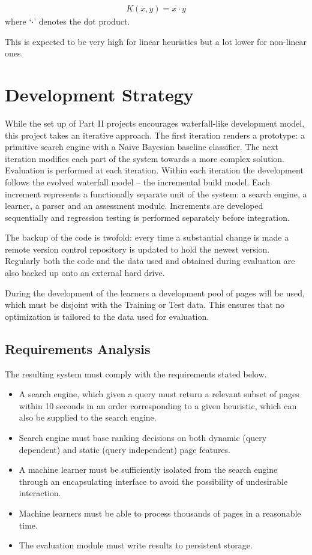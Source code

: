 \documentclass[12pt,twoside,notitlepage]{report}
\begin{document}
\begin{gather*}
K(x,y) = x \cdot y
\end{gather*}
where `\(\cdot\)' denotes the dot product.

This is expected to be very high for linear heuristics but a lot lower for
non-linear ones.

\section{Development Strategy}
While the set up of Part II projects encourages waterfall-like development
model, this project takes an iterative approach. The first iteration renders a
prototype: a primitive search engine with a Naive Bayesian baseline classifier.
The next iteration modifies each part of the system towards a more complex
solution. Evaluation is performed at each iteration. Within each  iteration the
development follows the evolved waterfall model -- the incremental build model.
Each increment represents a functionally separate unit of the system: a search
engine, a learner, a parser and an assessment module. Increments are developed
sequentially and regression testing is performed separately before integration.

The backup of the code is twofold: every time a substantial change is made a remote
version control repository is updated to hold the newest version. Regularly both the code and
the data used and obtained during evaluation are also backed up onto an
external hard drive. 

During the development of the learners a development pool of pages will
be used, which must be disjoint with the Training or Test data. This ensures
that no optimization is tailored to the data used for evaluation. 

\subsection*{Requirements Analysis}
The resulting system must comply with the requirements stated below. 
\begin{itemize}
  \item{A search engine, which given a query must return a relevant subset of
      pages within 10 seconds in an order corresponding to a given heuristic, which can also be
  supplied to the search engine.}
  \item{Search engine must base ranking decisions on both dynamic
      (query dependent) and static (query independent)
    page features.}
  \item{A machine learner must be sufficiently isolated from the search engine
    through an encapsulating interface to avoid the possibility of undesirable interaction.}
  \item{Machine learners must be able to process thousands of pages in a
    reasonable time.}
  \item{The evaluation module must write results to persistent storage.}
\end{itemize}
\cleardoublepage
\end{document}
